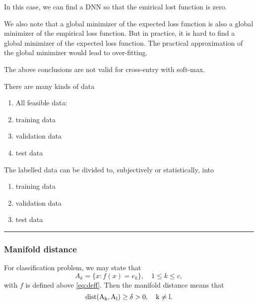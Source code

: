 In this case, we can find a DNN so that the emirical lost function is
zero. 

We also note that a global minimizer of the expected loss function is
also a global minimizer of the empirical loss function.  But in
practice, it is hard to find a global minimizer of the expected loss
function.  The practical approximation of the global minimizer would
lead to over-fitting. 

The above conclusions are not valid for cross-entry with soft-max.

There are many kinds of data
\begin{enumerate}
\item All feasible data:
\item training data
\item validation data
\item test data
\end{enumerate}

The labelled data can be divided to, subjectively or statistically,
into 
\begin{enumerate}
\item training data
\item validation data
\item test data
\end{enumerate}
\bigskip 
\hrule
\bigskip 

\subsubsection{Manifold distance}
For classification problem, we may state that 
\begin{equation}\label{def:manifoldAk}
A_k = \{x: f(x) = e_k\},\quad 1 \le k \le c,
\end{equation}
with $f$ is defined above \eqref{eq:deff}. Then the manifold distance means that
\begin{equation}\label{key}
\rm{dist}(A_k, A_l) \ge \delta > 0, \quad k \neq l.
\end{equation}
